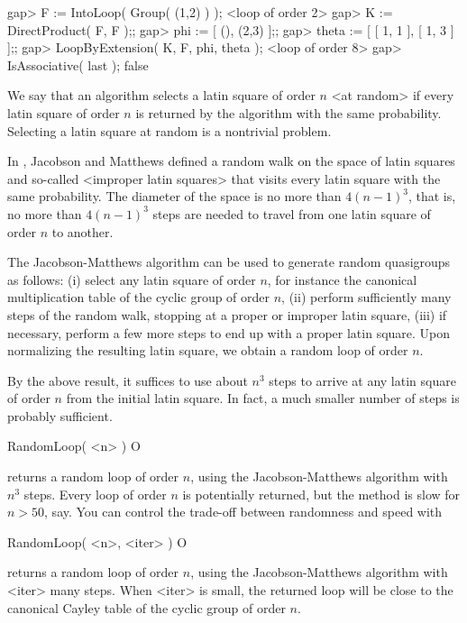 \beginexample
gap> F := IntoLoop( Group( (1,2) ) );
<loop of order 2>
gap> K := DirectProduct( F, F );;
gap> phi := [ (), (2,3) ];;
gap> theta := [ [ 1, 1 ], [ 1, 3 ] ];;
gap> LoopByExtension( K, F, phi, theta );
<loop of order 8>
gap> IsAssociative( last );
false
\endexample


We say that an algorithm selects a latin square of order $n$ <at
random>\label{random!Latin square} if every latin
square of order $n$ is returned by the algorithm with the same probability.
Selecting a latin square at random is a nontrivial problem.

In \cite{JaMa}, Jacobson and Matthews defined a random walk on the space of
latin squares and so-called <improper latin squares> that visits every latin
square with the same probability. The diameter of the space is no more than
$4(n-1)^3$, that is, no more than $4(n-1)^3$ steps are needed to travel from
one latin square of order $n$ to another.

The Jacobson-Matthews algorithm can be used to generate random quasigroups as
follows: (i) select any latin square of order $n$, for instance the canonical
multiplication table of the cyclic group of order $n$, (ii) perform
sufficiently many steps of the random walk, stopping at a proper or improper
latin square, (iii) if necessary, perform a few more steps to end up with a
proper latin square. Upon normalizing the resulting latin square, we obtain a
random loop of order $n$.

By the above result, it suffices to use about $n^3$ steps to arrive at any
latin square of order $n$ from the initial latin square. In fact, a much
smaller number of steps is probably
sufficient.

\>RandomLoop( <n> ) O

returns a random loop of order $n$, using the Jacobson-Matthews algorithm with
$n^3$ steps. Every loop of order $n$ is potentially returned, but the method is
slow for $n>50$, say. You can control the trade-off between randomness and speed with

\>RandomLoop( <n>, <iter> ) O

returns a random loop of order $n$, using the Jacobson-Matthews algorithm with
<iter> many steps. When <iter> is small, the returned loop will be close to the
canonical Cayley table of the cyclic group of order $n$.

